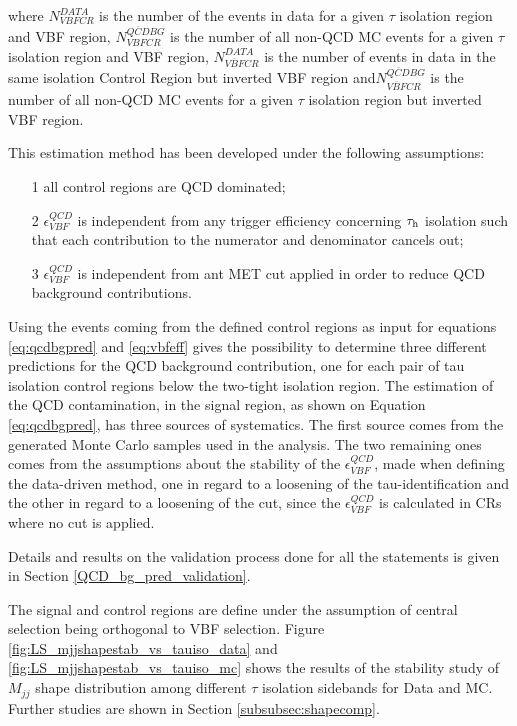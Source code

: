 where $N^{DATA}_{VBF CR}$ is the number of the events in data for a given $ \tau $ isolation region and VBF region, $N^{\overline{QCD} BG}_{VBFCR}$ is the number of all non-QCD MC events for a given $ \tau $ isolation region and VBF region, $N^{DATA}_{\overline{VBF}CR}$ is the number of events in data in the same isolation Control Region but inverted VBF region and$N^{\overline{QCD} BG}_{\overline{VBF}CR}$ is the number of all non-QCD MC events for a given $ \tau $ isolation region but inverted VBF region.

This estimation method has been developed under the following assumptions:

\begin{itemize}
	\item[1] all control regions are QCD dominated;
	\item[2] $\epsilon^{QCD}_{VBF}$ is independent from any trigger efficiency concerning $\tau_{\text{h}}$ isolation such that each contribution to the numerator and denominator cancels out;
	\item[3] $\epsilon^{QCD}_{VBF}$ is independent from ant MET cut applied in order to reduce QCD background contributions. 
\end{itemize}

Using the events coming from the defined control regions as input for equations \ref{eq:qcdbgpred} and \ref{eq:vbfeff} gives the possibility to determine three different predictions for the QCD background contribution, one for each pair of tau isolation control regions below the two-tight isolation region. The estimation of the QCD contamination, in the signal region, as shown on Equation \ref{eq:qcdbgpred}, has three sources of systematics. The first source comes from the generated Monte Carlo samples used in the analysis. The two remaining ones comes from the assumptions about the stability of the $\epsilon^{QCD}_{VBF}$, made when defining the data-driven method, one in regard to a loosening of the tau-identification and the other in regard to a loosening of the \met cut, since the $\epsilon^{QCD}_{VBF}$ is calculated in CRs where no \met cut is applied.

Details and results on the validation process done for all the statements is given in Section \ref{QCD_bg_pred_validation}.

The signal and control regions are define under the assumption of central selection being orthogonal to VBF selection. Figure \ref{fig:LS_mjjshapestab_vs_tauiso_data} and \ref{fig:LS_mjjshapestab_vs_tauiso_mc} shows the results of the stability study of $M_{jj}$ shape distribution among different $\tau$ isolation sidebands for Data and MC. Further studies are shown in Section \ref{subsubsec:shapecomp}.

